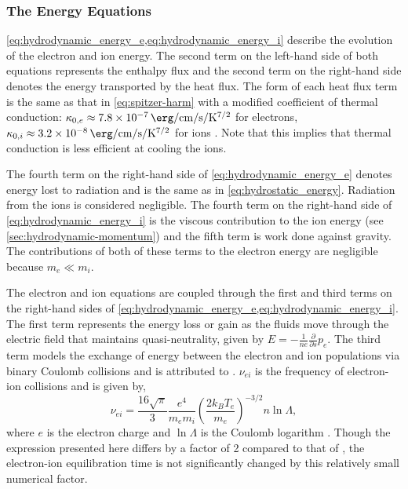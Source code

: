 \subsubsection{The Energy Equations}\label{sec:hydrodynamic-energy}

\cref{eq:hydrodynamic_energy_e,eq:hydrodynamic_energy_i} describe the evolution of the electron and ion energy. The second term on the left-hand side of both equations represents the enthalpy flux and the second term on the right-hand side denotes the energy transported by the heat flux. The form of each heat flux term is the same as that in \autoref{eq:spitzer-harm} with a modified coefficient of thermal conduction: $\kappa_{0,e}\approx\SI{7.8e-7}{\erg\per\cm\per\second\per\kelvin\tothe{7/2}}$ for electrons, $\kappa_{0,i}\approx\SI{3.2e-8}{\erg\per\cm\per\second\per\kelvin\tothe{7/2}}$ for ions \citep{bradshaw_influence_2013}. Note that this implies that thermal conduction is less efficient at cooling the ions. 

The fourth term on the right-hand side of \autoref{eq:hydrodynamic_energy_e} denotes energy lost to radiation and is the same as in \autoref{eq:hydrostatic_energy}. Radiation from the ions is considered negligible. The fourth term on the right-hand side of \autoref{eq:hydrodynamic_energy_i} is the viscous contribution to the ion energy (see \autoref{sec:hydrodynamic-momentum}) and the fifth term is work done against gravity. The contributions of both of these terms to the electron energy are negligible because $m_e\ll m_i$.

The electron and ion equations are coupled through the first and third terms on the right-hand sides of \cref{eq:hydrodynamic_energy_e,eq:hydrodynamic_energy_i}. The first term represents the energy loss or gain as the fluids move through the electric field that maintains quasi-neutrality, given by $E=-\frac{1}{ne}\frac{\partial}{\partial s}p_e$. The third term models the exchange of energy between the electron and ion populations via binary Coulomb collisions and is attributed to \citet{braginskii_transport_1965}. $\nu_{ei}$ is the frequency of electron-ion collisions and is given by,
\begin{equation}\label{eq:col_freq}
    \nu_{ei} = \frac{16\sqrt{\pi}}{3}\frac{e^4}{m_em_i}\left(\frac{2k_BT_e}{m_e}\right)^{-3/2}n\ln{\Lambda},
\end{equation}
where $e$ is the electron charge and $\ln{\Lambda}$ is the Coulomb logarithm \citep[see both Equation 2.5e and Section 3 of][]{braginskii_transport_1965}. Though the expression presented here differs by a factor of 2 compared to that of \citeauthor{braginskii_transport_1965}, the electron-ion equilibration time is not significantly changed by this relatively small numerical factor.


